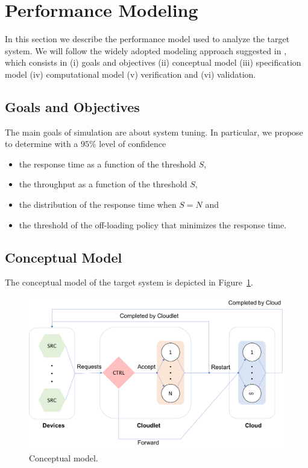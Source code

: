 \section{Performance Modeling}
\label{sec:performance-modeling}

In this section we describe the performance model used to analyze the target system. We will follow the widely adopted modeling approach suggested in \cite{leemis2006discrete}, which consists in (i) goals and objectives (ii) conceptual model (iii) specification model (iv) computational model (v) verification and (vi) validation.


\subsection{Goals and Objectives}
The main goals of simulation are about system tuning.
In particular, we propose to determine with a $95\%$ level of confidence
\begin{itemize}
	\item the response time as a function of the threshold $S$,
	\item the throughput as a function of the threshold $S$,
	\item the distribution of the response time when $S=N$ and
	\item the threshold of the off-loading policy that minimizes the response time.
\end{itemize}


\subsection{Conceptual Model}
The conceptual model of the target system is depicted in Figure~\ref{fig:conceptual-model}.

\begin{figure}
	\includegraphics[width=\columnwidth]{fig/conceptual-model}
	\caption{Conceptual model.}
	\label{fig:conceptual-model}
\end{figure}

